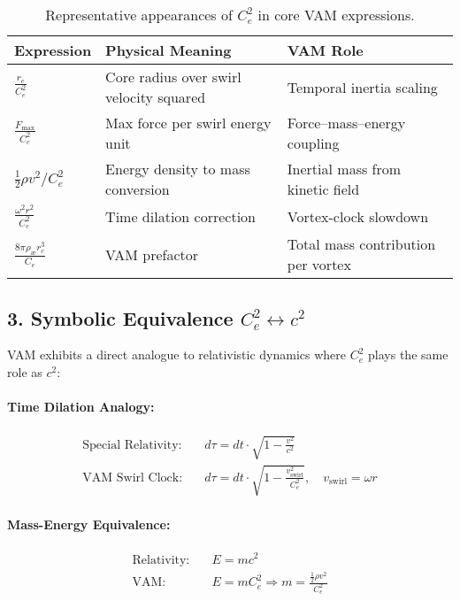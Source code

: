 \documentclass[12pt]{article}
\begin{document}
\begin{table}[H]
    \centering
    \renewcommand{\arraystretch}{1.3}
    \begin{tabular}{|l|l|l|}
        \hline
        \textbf{Expression} & \textbf{Physical Meaning} & \textbf{VAM Role} \\
        \hline
        $\frac{r_c}{C_e^2}$ & Core radius over swirl velocity squared & Temporal inertia scaling \\
        $\frac{F_{\text{max}}}{C_e^2}$ & Max force per swirl energy unit & Force–mass–energy coupling \\
        $\frac{1}{2} \rho v^2 / C_e^2$ & Energy density to mass conversion & Inertial mass from kinetic field \\
        $\frac{\omega^2 r^2}{C_e^2}$ & Time dilation correction & Vortex-clock slowdown \\
        $\frac{8\pi \rho_{\text{\ae}} r_c^3}{C_e}$ & VAM prefactor & Total mass contribution per vortex \\
        \hline
    \end{tabular}
    \caption{Representative appearances of \( C_e^2 \) in core VAM expressions.}
\end{table}

\subsection*{3. Symbolic Equivalence \( C_e^2 \leftrightarrow c^2 \)}

VAM exhibits a direct analogue to relativistic dynamics where \( C_e^2 \) plays the same role as \( c^2 \):

\paragraph{Time Dilation Analogy:}
\begin{align*}
    \text{Special Relativity:}\quad & d\tau = dt \cdot \sqrt{1 - \frac{v^2}{c^2}} \\
    \text{VAM Swirl Clock:}\quad & d\tau = dt \cdot \sqrt{1 - \frac{v_{\text{swirl}}^2}{C_e^2}}, \quad v_{\text{swirl}} = \omega r
\end{align*}

\paragraph{Mass-Energy Equivalence:}
\begin{align*}
    \text{Relativity:}\quad & E = mc^2 \\
    \text{VAM:}\quad & E = m C_e^2 \Rightarrow m = \frac{\frac{1}{2} \rho v^2}{C_e^2}
\end{align*}
\end{document}
